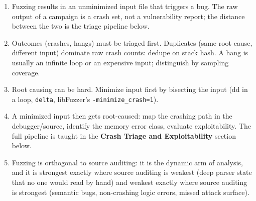 \documentclass[12pt]{Training}
\begin{document}
\begin{enumerate}
    \item Fuzzing results in an unminimized input file that triggers a bug. The raw output of a campaign is a crash set, not a vulnerability report; the distance between the two is the triage pipeline below.
    \item Outcomes (crashes, hangs) must be triaged first. Duplicates (same root cause, different input) dominate raw crash counts: dedupe on stack hash. A hang is usually an infinite loop or an expensive input; distinguish by sampling coverage.
    \item Root causing can be hard. Minimize input first by bisecting the input (dd in a loop, \lstinline{delta}, libFuzzer's \lstinline{-minimize_crash=1}).
    \item A minimized input then gets root-caused: map the crashing path in the debugger/source, identify the memory error class, evaluate exploitability. The full pipeline is taught in the \textbf{Crash Triage and Exploitability} section below.
    \item Fuzzing is orthogonal to source auditing: it is the dynamic arm of analysis, and it is strongest exactly where source auditing is weakest (deep parser state that no one would read by hand) and weakest exactly where source auditing is strongest (semantic bugs, non-crashing logic errors, missed attack surface).
\end{enumerate}
\end{document}
